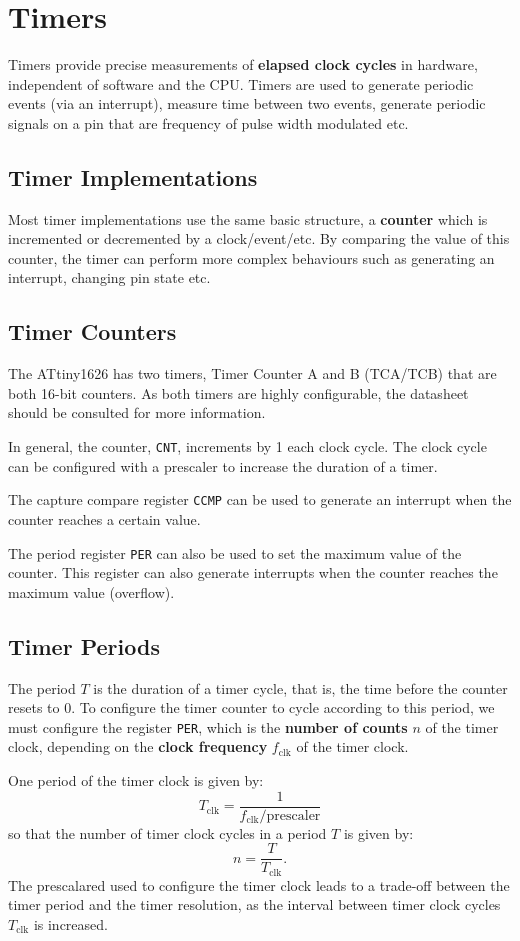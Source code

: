 \documentclass[a4paper]{report}
\begin{document}
\section{Timers}
Timers provide precise measurements of \textbf{elapsed clock cycles} in
hardware, independent of software and the CPU\@. Timers are used to
generate periodic events (via an interrupt), measure time between two
events, generate periodic signals on a pin that are frequency of pulse
width modulated etc.
\subsection{Timer Implementations}
Most timer implementations use the same basic structure, a
\textbf{counter} which is incremented or decremented by a
clock/event/etc. By comparing the value of this counter, the timer can
perform more complex behaviours such as generating an interrupt,
changing pin state etc.
\subsection{Timer Counters}
The ATtiny1626 has two timers, Timer Counter A and B (TCA/TCB) that are
both 16-bit counters. As both timers are highly configurable, the
datasheet should be consulted for more information.

In general, the counter, \texttt{CNT}, increments by 1 each
clock cycle. The clock cycle can be configured with a prescaler to
increase the duration of a timer.

The capture compare register \texttt{CCMP} can be used to
generate an interrupt when the counter reaches a certain value.

The period register \texttt{PER} can also be used to set the
maximum value of the counter. This register can also generate
interrupts when the counter reaches the maximum value (overflow).
\subsection{Timer Periods}
The period \(T\) is the duration of a timer cycle, that is, the time
before the counter resets to 0. To configure the timer counter to cycle
according to this period, we must configure the register
\texttt{PER}, which is the \textbf{number of counts} \(n\) of
the timer clock, depending on the \textbf{clock frequency}
\(f_\mathrm{clk}\) of the timer clock.

One period of the timer clock is given by:
\begin{equation*}
    T_\mathrm{clk} = \frac{1}{f_\mathrm{clk} / \mathrm{prescaler}}
\end{equation*}
so that the number of timer clock cycles in a period \(T\) is given by:
\begin{equation*}
    n = \frac{T}{T_\mathrm{clk}}.
\end{equation*}
The prescalared used to configure the timer clock leads to a trade-off between
the timer period and the timer resolution, as the interval between timer clock cycles \(T_\mathrm{clk}\)
is increased.
\end{document}
